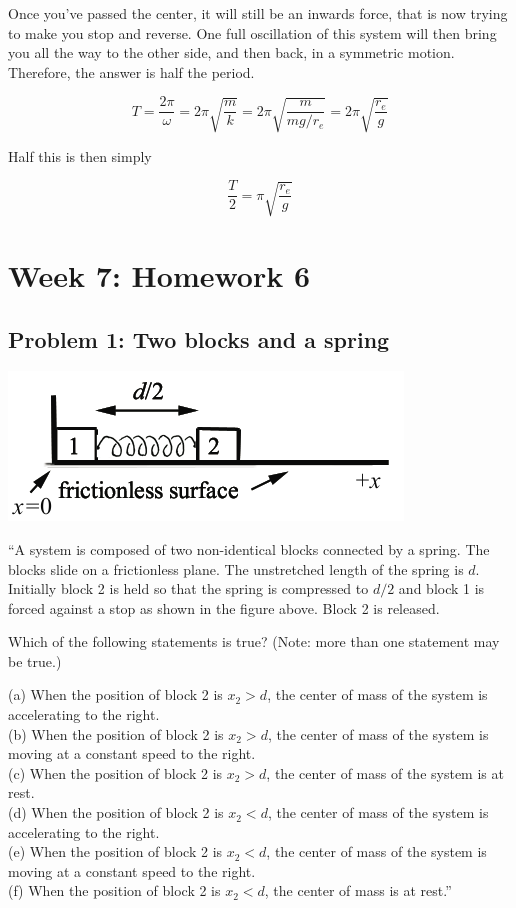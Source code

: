 \documentclass[12pt,a4paper]{report}
\begin{document}
Once you've passed the center, it will still be an inwards force, that is now trying to make you stop and reverse. One full oscillation of this system will then bring you all the way to the other side, and then back, in a symmetric motion. Therefore, the answer is half the period.

\begin{equation}
T = \frac{2 \pi}{\omega} = 2\pi \sqrt{\frac{m}{k}} = 2\pi \sqrt{\frac{m}{mg/r_e}} = 2 \pi \sqrt{\frac{r_e}{g}}
\end{equation}

Half this is then simply

\begin{equation}
\frac{T}{2} = \pi\sqrt{\frac{r_e}{g}}
\end{equation}

\chapter{Week 7: Homework 6}

\section{Problem 1: Two blocks and a spring}

\begin{center}
\includegraphics[scale=0.6]{Graphics/h6p1}
\end{center}

``A system is composed of two non-identical blocks connected by a spring. The blocks slide on a frictionless plane. The unstretched length of the spring is $d$. Initially block 2 is held so that the spring is compressed to $d/2$ and block 1 is forced against a stop as shown in the figure above. Block 2 is released.

Which of the following statements is true? (Note: more than one statement may be true.)

(a) When the position of block 2 is $x_2 > d$, the center of mass of the system is accelerating to the right.\\
(b) When the position of block 2 is $x_2 > d$, the center of mass of the system is moving at a constant speed to the right.\\
(c) When the position of block 2 is $x_2 > d$, the center of mass of the system is at rest.\\
(d) When the position of block 2 is $x_2 < d$, the center of mass of the system is accelerating to the right.\\
(e) When the position of block 2 is $x_2 < d$, the center of mass of the system is moving at a constant speed to the right.\\
(f) When the position of block 2 is $x_2 < d$, the center of mass is at rest.''
\end{document}

